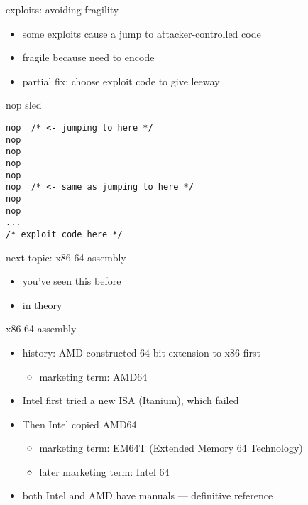 \begin{frame}{exploits: avoiding fragility}
    \begin{itemize}
    \item some exploits cause a jump to attacker-controlled code
    \item fragile because need to encode 
    \item partial fix: choose exploit code to give leeway
    \end{itemize}
\end{frame}

\begin{frame}[fragile,label=nopSled]{nop sled}
\begin{lstlisting}[style=small,language=myasm]
nop  /* <- jumping to here */
nop
nop
nop
nop
nop  /* <- same as jumping to here */
nop
nop
...
/* exploit code here */
\end{lstlisting}
\end{frame}


\begin{frame}{next topic: x86-64 assembly}
    \begin{itemize}
    \item you've seen this before
    \item in theory
    \end{itemize}
\end{frame}

\begin{frame}{x86-64 assembly}
\begin{itemize}
\item history: AMD constructed 64-bit extension to x86 first
    \begin{itemize}
    \item marketing term: AMD64
    \end{itemize}
\item Intel first tried a new ISA (Itanium), which failed
\item Then Intel copied AMD64
    \begin{itemize}
    \item marketing term: EM64T (Extended Memory 64 Technology)
    \item later marketing term: Intel 64
    \end{itemize}
\item both Intel and AMD have manuals --- definitive reference
\end{itemize}
\end{frame}

